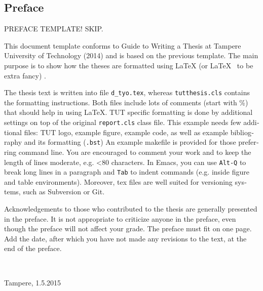 \documentclass[12pt,a4paper,english]{tutthesis}
\begin{document}
\begin{otherlanguage}{english} %
\makeatother %

%
%
\chapter*{Preface}

PREFACE TEMPLATE! SKIP.

This document template conforms to Guide to Writing a Thesis at
Tampere University of Technology (2014) and is based on the previous
template. The main purpose is to show how the theses are formatted
using LaTeX (or \LaTeX ~ to be extra fancy) .


The thesis text is written into file \texttt{d\_tyo.tex}, whereas
\texttt{tutthesis.cls} contains the formatting instructions. Both
files include lots of comments (start with \%) that should help in
using LaTeX. TUT specific formatting is done by additional settings on
top of the original \texttt{report.cls} class file. This example needs
few additional files: TUT logo, example figure, example code, as well
as example bibliography and its formatting (\texttt{.bst}) An example
makefile is provided for those preferring command line. You are
encouraged to comment your work and to keep the length of lines
moderate, e.g. <80 characters. In Emacs, you can use \texttt{Alt-Q} to
break long lines in a paragraph and \texttt{Tab} to indent commands
(e.g. inside figure and table environments). Moreover, tex files are
well suited for versioning systems, such as Subversion or Git.  

Acknowledgements to those who contributed to the thesis are generally
presented in the preface. It is not appropriate to criticize anyone in
the preface, even though the preface will not affect your grade. The
preface must fit on one page. Add the date, after which you have not
made any revisions to the text, at the end of the preface.

~ 

Tampere, 1.5.2015
~



\end{otherlanguage}
\end{document}
